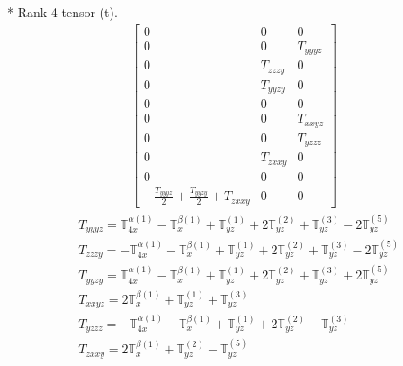 \documentclass[fleqn,8pt,landscape]{jsarticle}
\begin{document}
* Rank 4 tensor (t).
\begin{align*}
\begin{bmatrix} 0 & 0 & 0 \\ 0 & 0 & T_{yyyz} \\ 0 & T_{zzzy} & 0 \\ 0 & T_{yyzy} & 0 \\ 0 & 0 & 0 \\ 0 & 0 & T_{xxyz} \\ 0 & 0 & T_{yzzz} \\ 0 & T_{zxxy} & 0 \\ 0 & 0 & 0 \\ - \frac{T_{yyyz}}{2} + \frac{T_{yyzy}}{2} + T_{zxxy} & 0 & 0 \end{bmatrix}
\end{align*}
\begin{align*}
& T_{yyyz} = \mathbb{T}_{4x}^{\alpha(1)} - \mathbb{T}_{x}^{\beta(1)} + \mathbb{T}_{yz}^{(1)} + 2 \mathbb{T}_{yz}^{(2)} + \mathbb{T}_{yz}^{(3)} - 2 \mathbb{T}_{yz}^{(5)} \\
& T_{zzzy} = - \mathbb{T}_{4x}^{\alpha(1)} - \mathbb{T}_{x}^{\beta(1)} + \mathbb{T}_{yz}^{(1)} + 2 \mathbb{T}_{yz}^{(2)} + \mathbb{T}_{yz}^{(3)} - 2 \mathbb{T}_{yz}^{(5)} \\
& T_{yyzy} = \mathbb{T}_{4x}^{\alpha(1)} - \mathbb{T}_{x}^{\beta(1)} + \mathbb{T}_{yz}^{(1)} + 2 \mathbb{T}_{yz}^{(2)} + \mathbb{T}_{yz}^{(3)} + 2 \mathbb{T}_{yz}^{(5)} \\
& T_{xxyz} = 2 \mathbb{T}_{x}^{\beta(1)} + \mathbb{T}_{yz}^{(1)} + \mathbb{T}_{yz}^{(3)} \\
& T_{yzzz} = - \mathbb{T}_{4x}^{\alpha(1)} - \mathbb{T}_{x}^{\beta(1)} + \mathbb{T}_{yz}^{(1)} + 2 \mathbb{T}_{yz}^{(2)} - \mathbb{T}_{yz}^{(3)} \\
& T_{zxxy} = 2 \mathbb{T}_{x}^{\beta(1)} + \mathbb{T}_{yz}^{(2)} - \mathbb{T}_{yz}^{(5)}
\end{align*}
\end{document}
